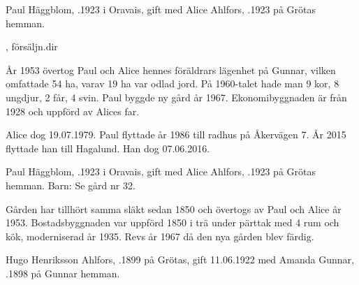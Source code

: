 Paul Häggblom, .1923 i Oravais, gift med Alice Ahlfors, .1923 på Grötas hemman.
\begin{jhchildren}
  \item {}
  \item {}, försäljn.dir
  \item {}
  \item {}
  \item {}
\end{jhchildren}

År 1953 övertog Paul och Alice hennes föräldrars lägenhet på Gunnar, vilken omfattade 54 ha, varav 19 ha var odlad jord. På 1960-talet hade man 9 kor, 8 ungdjur, 2 får, 4 svin. Paul byggde ny gård år 1967. Ekonomibyggnaden är från 1928 och uppförd av Alices far.

Alice dog 19.07.1979. Paul flyttade år 1986 till radhus på Åkervägen 7. År 2015 flyttade han till Hagalund. Han dog 07.06.2016.




Paul Häggblom, .1923 i Oravais, gift med Alice Ahlfors, .1923 på Grötas hemman. Barn: Se gård nr 32.

Gården har tillhört samma släkt sedan 1850 och övertogs av Paul och Alice år 1953. Bostadsbyggnaden var uppförd 1850 i trä under pärttak med 4 rum och kök, moderniserad år 1935. Revs år 1967 då den nya gården blev färdig.


Hugo Henriksson Ahlfors, .1899 på Grötas, gift 11.06.1922 med Amanda Gunnar, .1898 på Gunnar hemman.
\begin{jhchildren}
  \item {}
  \item {}
\end{jhchildren}

